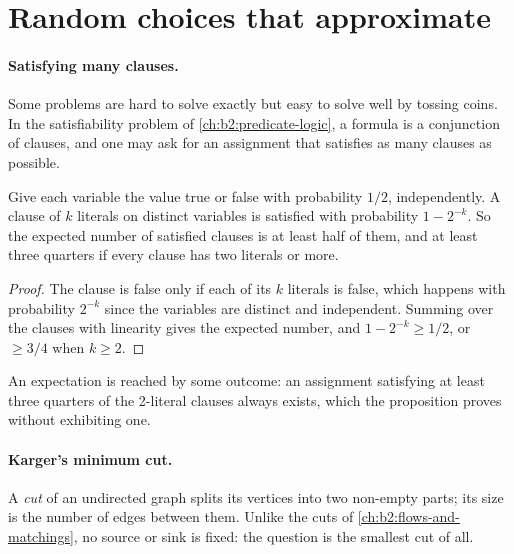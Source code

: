 \section{Random choices that approximate}\label{sec:b2:randomised-algorithms:approximate}

\paragraph{Satisfying many clauses.} Some problems are hard to solve exactly but easy to solve well by tossing coins. In
the satisfiability problem of \cref{ch:b2:predicate-logic}, a formula is a conjunction of clauses, and one may ask for an
assignment that satisfies as many clauses as possible.

\begin{proposition}\label{prop:b2:randomised-algorithms:maxsat}
Give each variable the value true or false with probability $1/2$, independently. A clause of $k$ literals on distinct
variables is satisfied with probability $1 - 2^{-k}$. So the expected number of satisfied clauses is at least half of
them, and at least three quarters if every clause has two literals or more.
\end{proposition}

\begin{proof}
The clause is false only if each of its $k$ literals is false, which happens with probability $2^{-k}$ since the
variables are distinct and independent. Summing over the clauses with linearity gives the expected number, and $1 -
2^{-k} \geq 1/2$, or $\geq 3/4$ when $k \geq 2$.
\end{proof}

\label{out:b2:randomised-algorithms:maxsat}

An expectation is reached by some outcome: an assignment satisfying at least three quarters of the 2-literal clauses
always exists, which the proposition proves without exhibiting one.

\paragraph{Karger's minimum cut.} A \emph{cut} of an undirected graph splits its vertices into two non-empty parts; its
size is the number of edges between them. Unlike the cuts of \cref{ch:b2:flows-and-matchings}, no source or sink is
fixed: the question is the smallest cut of all.

